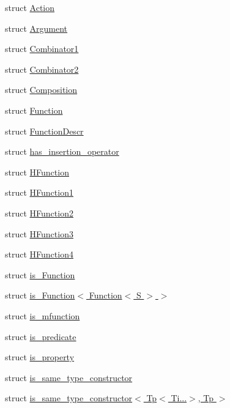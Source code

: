 \begin{DoxyCompactItemize}
\item 
struct \hyperlink{structpfq_1_1lang_1_1Action}{Action}
\item 
struct \hyperlink{structpfq_1_1lang_1_1Argument}{Argument}
\item 
struct \hyperlink{structpfq_1_1lang_1_1Combinator1}{Combinator1}
\item 
struct \hyperlink{structpfq_1_1lang_1_1Combinator2}{Combinator2}
\item 
struct \hyperlink{structpfq_1_1lang_1_1Composition}{Composition}
\item 
struct \hyperlink{structpfq_1_1lang_1_1Function}{Function}
\item 
struct \hyperlink{structpfq_1_1lang_1_1FunctionDescr}{Function\+Descr}
\item 
struct \hyperlink{structpfq_1_1lang_1_1has__insertion__operator}{has\+\_\+insertion\+\_\+operator}
\item 
struct \hyperlink{structpfq_1_1lang_1_1HFunction}{H\+Function}
\item 
struct \hyperlink{structpfq_1_1lang_1_1HFunction1}{H\+Function1}
\item 
struct \hyperlink{structpfq_1_1lang_1_1HFunction2}{H\+Function2}
\item 
struct \hyperlink{structpfq_1_1lang_1_1HFunction3}{H\+Function3}
\item 
struct \hyperlink{structpfq_1_1lang_1_1HFunction4}{H\+Function4}
\item 
struct \hyperlink{structpfq_1_1lang_1_1is__Function}{is\+\_\+\+Function}
\item 
struct \hyperlink{structpfq_1_1lang_1_1is__Function_3_01Function_3_01S_01_4_01_4}{is\+\_\+\+Function$<$ Function$<$ S $>$ $>$}
\item 
struct \hyperlink{structpfq_1_1lang_1_1is__mfunction}{is\+\_\+mfunction}
\item 
struct \hyperlink{structpfq_1_1lang_1_1is__predicate}{is\+\_\+predicate}
\item 
struct \hyperlink{structpfq_1_1lang_1_1is__property}{is\+\_\+property}
\item 
struct \hyperlink{structpfq_1_1lang_1_1is__same__type__constructor}{is\+\_\+same\+\_\+type\+\_\+constructor}
\item 
struct \hyperlink{structpfq_1_1lang_1_1is__same__type__constructor_3_01Tp_3_01Ti_8_8_8_4_00_01Tp_01_4}{is\+\_\+same\+\_\+type\+\_\+constructor$<$ Tp$<$ Ti...$>$, Tp $>$}
\item 

\end{DoxyCompactItemize}
